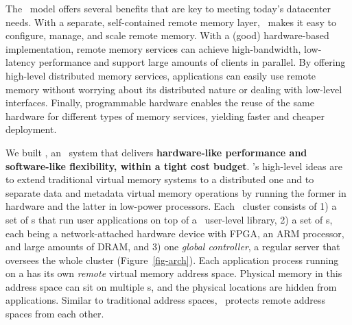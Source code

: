 The \phdm\ model offers several benefits that are key to meeting today's datacenter needs.
With a separate, self-contained remote memory layer, 
\phdm\ makes it easy to configure, manage, and scale remote memory.
With a (good) hardware-based implementation, remote memory services can achieve
high-bandwidth, low-latency performance 
and support large amounts of clients in parallel.
By offering high-level distributed memory services, 
applications can easily use remote memory without 
worrying about its distributed nature or dealing with low-level interfaces.
Finally, programmable hardware enables the reuse of the same hardware for different 
types of memory services, yielding faster and cheaper deployment. %

We built {\em \sys},
an \phdm\ system %
that delivers {\bf hardware-like performance and software-like flexibility, within a tight cost budget}.
\sys's high-level ideas are to extend traditional virtual memory systems to a distributed one 
and to separate data and metadata virtual memory operations by running the former in hardware and the latter in low-power processors.
Each \sys\ cluster consists of 1) a set of \CN{}s that run user applications on top of a \sys\ user-level library,
2) a set of \MN{}s, each being a network-attached hardware device with FPGA, 
an ARM processor, and large amounts of DRAM,
and 3) one {\em global controller}, a regular server that oversees the whole
cluster (Figure~\ref{fig-arch}).
Each application process running on a \CN{} has its own {\em remote} virtual memory address space.
Physical memory in this address space can sit on multiple \MN{}s,
and the physical locations are hidden from applications.
Similar to traditional address spaces, \sys\ protects remote address spaces from each other.

